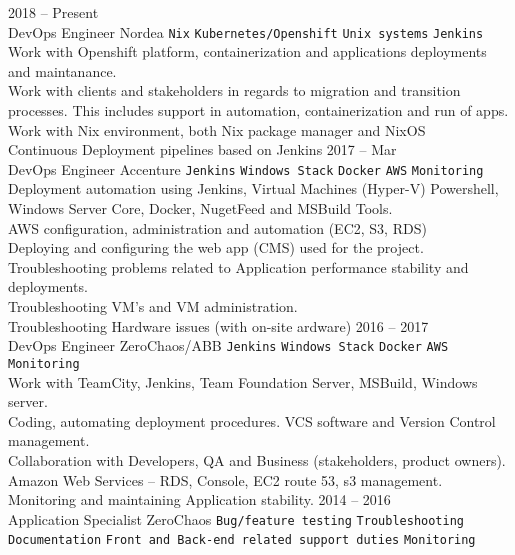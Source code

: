 \documentclass[9pt]{style/developercv}
\begin{document}
\begin{entrylist}
	\entry
	    {2018 -- Present\\\footnotesize{DevOps Engineer}}
		{Nordea}
		{
			\texttt{Nix}\slashsep
			\texttt{Kubernetes/Openshift}\slashsep
			\texttt{Unix systems}\slashsep
			\texttt{Jenkins}\\

			Work with Openshift platform, containerization and applications deployments and maintanance. \\
			Work with clients and stakeholders in regards to migration and transition processes. This includes support in automation, containerization and run of apps. \\
			Work with Nix environment, both Nix package manager and NixOS \\
			Continuous Deployment pipelines based on Jenkins
		}
	\entry
		{2017 -- Mar\\\footnotesize{DevOps Engineer}}
		{Accenture}
		{
			\texttt{Jenkins}\slashsep
			\texttt{Windows Stack}\slashsep
			\texttt{Docker}\slashsep
			\texttt{AWS}\slashsep
			\texttt{Monitoring}\\
 
 			Deployment automation using Jenkins, Virtual Machines (Hyper-V) Powershell, Windows Server Core, Docker, NugetFeed and MSBuild Tools.\\ 
 			AWS configuration, administration and automation (EC2, S3, RDS)\\
 			Deploying and configuring the web app (CMS) used for the project.\\
			Troubleshooting problems related to Application performance stability and deployments.\\
			Troubleshooting VM's and VM administration.\\
			Troubleshooting Hardware issues (with on-site ardware)
		}
	\entry
		{2016 -- 2017\\\footnotesize{DevOps Engineer}}
		{ZeroChaos/ABB}
		{
			\texttt{Jenkins}\slashsep
			\texttt{Windows Stack}\slashsep
			\texttt{Docker}\slashsep
			\texttt{AWS}\slashsep
			\texttt{Monitoring}\\

			Work with TeamCity, Jenkins, Team Foundation Server, MSBuild, Windows server.\\
			Coding, automating deployment procedures. VCS software and Version Control management.\\
			Collaboration with Developers, QA and Business (stakeholders, product owners).\\
			Amazon Web Services – RDS, Console, EC2 route 53, s3 management.\\
			Monitoring and maintaining Application stability.
		}
	\entry
		{2014 -- 2016\\\footnotesize{Application Specialist}}
		{ZeroChaos}
		{
			\texttt{Bug/feature testing}\slashsep
			\texttt{Troubleshooting}\slashsep
			\texttt{Documentation}\slashsep
			\texttt{Front and Back-end related support duties}\slashsep
			\texttt{Monitoring}\\

}
\end{entrylist}
\end{document}
